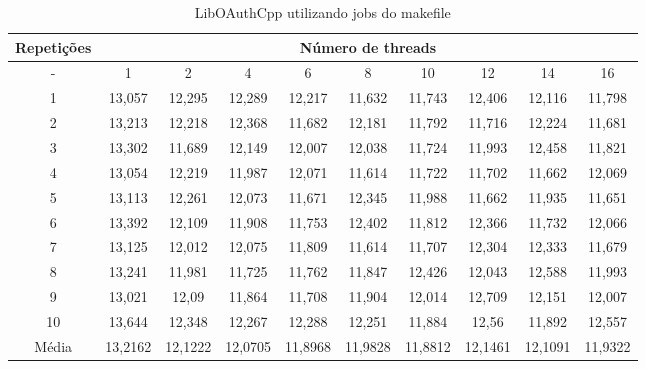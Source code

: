 \begin{table}[h]
\centering
\caption{LibOAuthCpp utilizando jobs do makefile}
\label{tab:liboauthcpp}
\begin{tiny}
\begin{tabular}{cccccccccc}
\toprule
\textbf{Repetições} & \multicolumn{9}{c}{\textbf{Número de threads}} \\ \midrule
- & 1 & 2 & 4 & 6 & 8 & 10 & 12 & 14 & 16 \\ 
1 & 13,057   & 12,295   & 12,289   & 12,217   &  11,632   &  11,743  &  12,406  &   12,116  &   11,798 \\ 
2 & 13,213   & 12,218   & 12,368   & 11,682   &  12,181   &  11,792  &  11,716  &   12,224  &   11,681 \\ 
3 & 13,302   & 11,689   & 12,149   & 12,007   &  12,038   &  11,724  &  11,993  &   12,458  &   11,821 \\ 
4 & 13,054   & 12,219   & 11,987   & 12,071   &  11,614   &  11,722  &  11,702  &   11,662  &   12,069 \\ 
5 & 13,113   & 12,261   & 12,073   & 11,671   &  12,345   &  11,988  &  11,662  &   11,935  &   11,651 \\ 
6 & 13,392   & 12,109   & 11,908   & 11,753   &  12,402   &  11,812  &  12,366  &   11,732  &   12,066 \\ 
7 & 13,125   & 12,012   & 12,075   & 11,809   &  11,614   &  11,707  &  12,304  &   12,333  &   11,679 \\ 
8 & 13,241   & 11,981   & 11,725   & 11,762   &  11,847   &  12,426  &  12,043  &   12,588  &   11,993 \\ 
9 & 13,021   & 12,09    & 11,864   & 11,708   &  11,904   &  12,014  &  12,709  &   12,151  &   12,007 \\ 
10 & 13,644   & 12,348   & 12,267   & 12,288   &  12,251   &  11,884  &  12,56   &   11,892  &   12,557 \\ \midrule
Média & 13,2162  & 12,1222  & 12,0705  & 11,8968  &  11,9828  &  11,8812 &  12,1461 &   12,1091 &   11,9322 \\ \bottomrule
\end{tabular}
\end{tiny}
\end{table}

